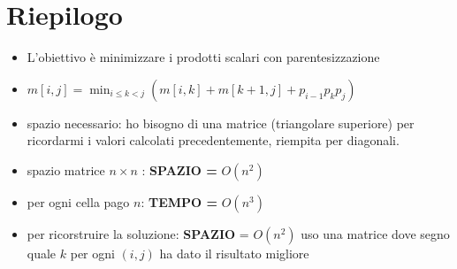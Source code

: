 \section{Riepilogo}

\begin{itemize}
  \item
        L'obiettivo è minimizzare i prodotti scalari con parentesizzazione
  \item
        $m[i,j] = \min_{i \leq k < j} (m[i,k] + m[k+1, j] + p_{i-1} p_k p_j)$
  \item
        spazio necessario: ho bisogno di una matrice (triangolare superiore)
        per ricordarmi i valori calcolati precedentemente, riempita per
        diagonali.
  \item
        spazio matrice $n \times n$ : \textbf{SPAZIO =} $O(n^2)$
  \item
        per ogni cella pago $n$: \textbf{TEMPO =} $O(n^3)$
  \item
        per ricorstruire la soluzione: \textbf{SPAZIO} = $O(n^2)$ uso una
        matrice dove segno quale $k$ per ogni $(i,j)$ ha dato il risultato
        migliore
\end{itemize}
